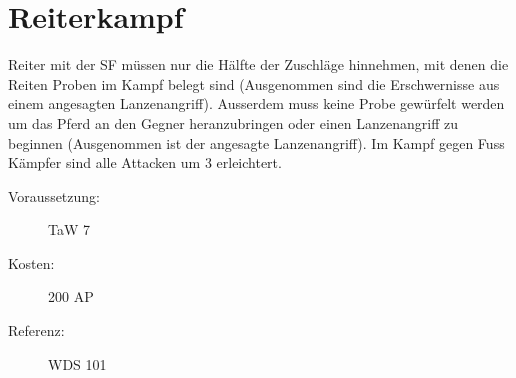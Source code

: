 \section{Reiterkampf}
\label{sf.reiterkampf}
Reiter mit der SF  müssen nur die Hälfte der Zuschläge hinnehmen, mit denen die Reiten Proben im Kampf belegt sind (Ausgenommen sind die Erschwernisse aus einem angesagten Lanzenangriff).
Ausserdem muss keine Probe gewürfelt werden um das Pferd an den Gegner heranzubringen oder einen Lanzenangriff zu beginnen (Ausgenommen ist der angesagte Lanzenangriff).
Im Kampf gegen Fuss Kämpfer sind alle Attacken um 3 erleichtert.
\begin{description}
    \item[Voraussetzung:]
        TaW  7
    \item [Kosten:]
        200 AP
    \item [Referenz:]
        WDS 101
\end{description}
